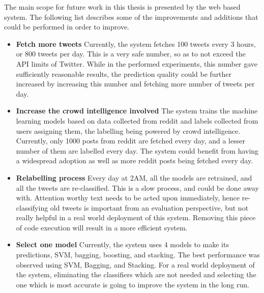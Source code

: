 The main scope for future work in this thesis is presented by the web based system. The following list describes some of the improvements and additions that could be performed in order to improve.

\begin{itemize}
    \item{\textbf{Fetch more tweets} Currently, the system fetches 100 tweets every 3 hours, or 800 tweets per day. This is a very safe number, so as to not exceed the API limits of Twitter. While in the performed experiments, this number gave sufficiently reasonable results, the prediction quality could be further increased by increasing this number and fetching more number of tweets per day.}
    \item{\textbf{Increase the crowd intelligence involved} The system trains the machine learning models based on data collected from reddit and labels collected from users assigning them, the labelling being powered by crowd intelligence. Currently, only 1000 posts from reddit are fetched every day, and a lesser number of them are labelled every day. The system could benefit from having a widespread adoption as well as more reddit posts being fetched every day.}
    \item{\textbf{Relabelling process} Every day at 2AM, all the models are retrained, and all the tweets are re-classified. This is a slow process, and could be done away with. Attention worthy text needs to be acted upon immediately, hence re-classifying old tweets is important from an evaluation perspective, but not really helpful in a real world deployment of this system. Removing this piece of code execution will result in a more efficient system.}
    \item{\textbf{Select one model} Currently, the system uses 4 models to make its predictions, SVM, bagging, boosting, and stacking. The best performance was observed using SVM, Bagging, and Stacking. For a real world deployment of the system, eliminating the classifiers which are not needed and selecting the one which is most accurate is going to improve the system in the long run.}
\end{itemize}
